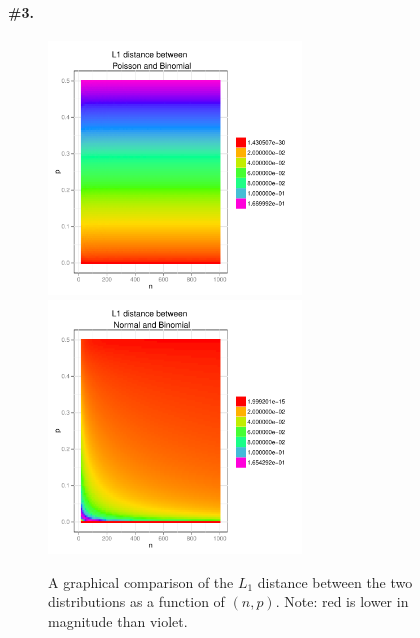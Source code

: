 \documentclass[12pt,titlepage]{article}
\begin{document}
\paragraph{\#3.}
\begin{figure}[thbp!]
\centering
\includegraphics[width=0.6\textwidth, trim = 5mm 0mm 10mm 6mm, clip]{stat201a_hw4-plot_L1_poisson.pdf} \\
\includegraphics[width=0.6\textwidth,trim = 5mm 0mm 10mm 6mm, clip]{stat201a_hw4-plot_L1_normal.pdf} 
\caption{A graphical comparison of the $L_1$ distance between the two distributions as a function of $(n,p)$. Note: red is lower in magnitude than violet.}
\end{figure}
\end{document}
